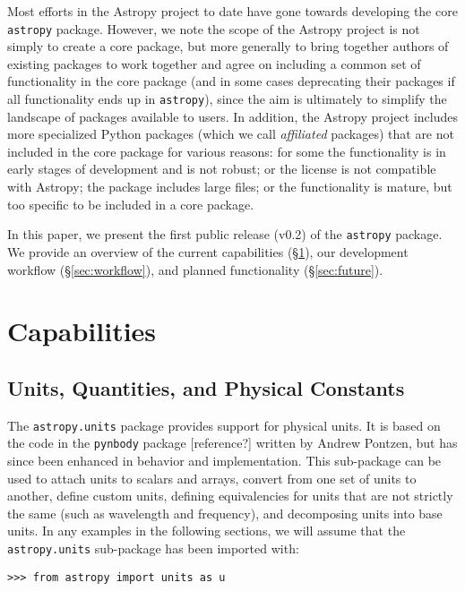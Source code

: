 \documentclass[traditabstract]{aa}
\newcommand{\astropy}{\texttt{astropy}\xspace}
\begin{document}
Most efforts in the Astropy project to date have gone towards developing the
core \astropy package. However, we note the scope of the Astropy project is
not simply to create a core package, but more generally to bring together
authors of existing packages to work together and agree on including a common
set of functionality in the core package (and in some cases deprecating their
packages if all functionality ends up in \astropy), since the aim is
ultimately to simplify the landscape of packages available to users. In
addition, the Astropy project includes more specialized Python packages (which
we call \textit{affiliated} packages) that are not included in the core
package for various reasons: for some the functionality is in early stages of
development and is not robust; or the license is not compatible with Astropy;
the package includes large files; or the functionality is mature, but too
specific to be included in a core package.

In this paper, we present the first public release (v0.2) of the \astropy
package. We provide an overview of the current capabilities
(\S\ref{sec:capabilities}), our development workflow (\S\ref{sec:workflow}),
and planned functionality (\S\ref{sec:future}).


\section{Capabilities}

\label{sec:capabilities}

\subsection{Units, Quantities, and Physical Constants}


The \texttt{astropy.units} package provides support for physical units. It is
based on the code in the \texttt{pynbody} package [reference?] written by
Andrew Pontzen, but has since been enhanced in behavior and implementation.
This sub-package can be used to attach units to scalars and arrays, convert
from one set of units to another, define custom units, defining equivalencies
for units that are not strictly the same (such as wavelength and frequency),
and decomposing units into base units. In any examples in the following
sections, we will assume that the \texttt{astropy.units} sub-package has been
imported with:
\begin{verbatim}
>>> from astropy import units as u
\end{verbatim}
\end{document}
